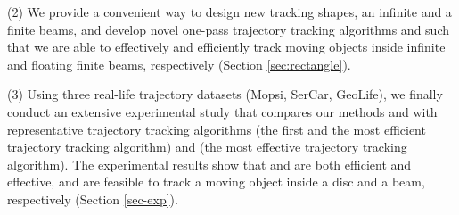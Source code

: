 \ni (2) We provide a convenient way to design new tracking shapes, \ie  an infinite and a finite beams, and develop novel one-pass trajectory tracking algorithms \sitt and \bitt such that we are able to effectively and efficiently track moving objects inside infinite and floating finite beams, respectively (Section \ref{sec:rectangle}). 

\ni (3) Using three real-life trajectory datasets (Mopsi, SerCar, GeoLife), we finally conduct an extensive experimental study that compares our methods \citt and \bitt with representative trajectory tracking algorithms \ldrh (the first and the most efficient trajectory tracking algorithm) and \grts (the most effective trajectory tracking algorithm). The experimental results show that \citt and \bitt are both efficient and effective, and are feasible to track a moving object inside a disc and a beam, respectively (Section \ref{sec-exp}).




